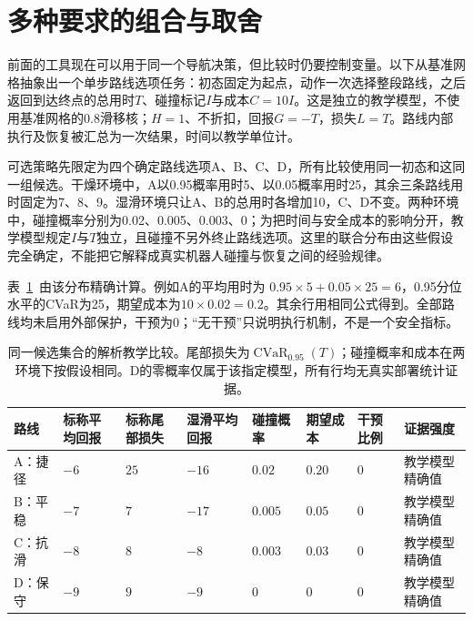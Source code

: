 \section{多种要求的组合与取舍}
\label{sec:rl-trustworthy-combination}

前面的工具现在可以用于同一个导航决策，但比较时仍要控制变量。以下从基准网格抽象出一个单步路线选项任务：初态固定为起点，动作一次选择整段路线，之后返回到达终点的总用时$T$、碰撞标记$I$与成本$C=10I$。这是独立的教学模型，不使用基准网格的0.8滑移核；$H=1$、不折扣，回报$G=-T$，损失$L=T$。路线内部执行及恢复被汇总为一次结果，时间以教学单位计。

可选策略先限定为四个确定路线选项A、B、C、D，所有比较使用同一初态和这同一组候选。干燥环境中，A以0.95概率用时5、以0.05概率用时25，其余三条路线用时固定为7、8、9。湿滑环境只让A、B的总用时各增加10，C、D不变。两种环境中，碰撞概率分别为0.02、0.005、0.003、0；为把时间与安全成本的影响分开，教学模型规定$I$与$T$独立，且碰撞不另外终止路线选项。这里的联合分布由这些假设完全确定，不能把它解释成真实机器人碰撞与恢复之间的经验规律。

表~\ref{tab:rl-trustworthy-comparison}~由该分布精确计算。例如A的平均用时为
$0.95\times5+0.05\times25=6$，0.95分位水平的CVaR为25，期望成本为$10\times0.02=0.2$。其余行用相同公式得到。全部路线均未启用外部保护，干预为0；“无干预”只说明执行机制，不是一个安全指标。

\begin{table}[t]
  \centering
  \begin{tabularx}{\linewidth}{@{}>{\raggedright\arraybackslash}p{14mm}XXXXXXX@{}}
    \toprule
    路线 & 标称平均回报 & 标称尾部损失 & 湿滑平均回报 & 碰撞概率 & 期望成本 & 干预比例 & 证据强度 \\
    \midrule
    A：捷径 & $-6$ & $25$ & $-16$ & $0.02$ & $0.20$ & $0$ & 教学模型精确值 \\
    B：平稳 & $-7$ & $7$ & $-17$ & $0.005$ & $0.05$ & $0$ & 教学模型精确值 \\
    C：抗滑 & $-8$ & $8$ & $-8$ & $0.003$ & $0.03$ & $0$ & 教学模型精确值 \\
    D：保守 & $-9$ & $9$ & $-9$ & $0$ & $0$ & $0$ & 教学模型精确值 \\
    \bottomrule
  \end{tabularx}
  \caption{同一候选集合的解析教学比较。尾部损失为$\operatorname{CVaR}_{0.95}(T)$；碰撞概率和成本在两环境下按假设相同。D的零概率仅属于该指定模型，所有行均无真实部署统计证据。}
  \label{tab:rl-trustworthy-comparison}
\end{table}


